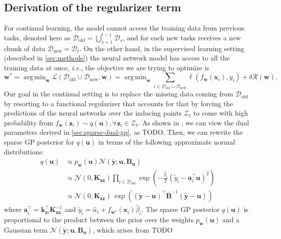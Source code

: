 \documentclass{article}
\makeatletter
\newcommand{\ie}{\textit{i.e.\@}\xspace}
\newcommand{\dataset}{\ensuremath{\mathcal{D}}}
\newcommand{\weights}{\ensuremath{\mathbf{w}}}
\newcommand{\mbf}[1]{\mathbf{#1}}
\newcommand{\MB}{\mbf{B}}
\newcommand{\vz}{\mbf{z}}
\newcommand{\vu}{\mbf{u}}
\newcommand{\vx}{\mbf{x}}
\newcommand{\vy}{\mbf{y}}
\newcommand{\vw}{\mbf{w}}
\newcommand{\va}{\mbf{a}}
\newcommand{\MKzz}{\mbf{K}_{\mbf{z}\mbf{z}}}
\newcommand{\vkzi}{\mbf{k}_{\mbf{z}i}}
\DeclareMathOperator*{\argmin}{arg\,min}
\newcommand{\Norm}{\mathcal{N}}
\makeatother
\begin{document}
\subsection{Derivation of the regularizer term}
For continual learning, the model cannot access the training data from previous tasks, denoted here as $\dataset_\textrm{old} = \bigcup_{s=1}^{t-1} \dataset_s$, and for each new tasks receives a new chunk of data $\dataset_\textrm{new} = \dataset_t$. On the other hand, in the supervised learning setting (described in \cref{sec:methods}) the neural network model has access to all the training data at once, \ie, the objective we are trying to optimize is
\begin{equation}
	\weights^* = \argmin_\weights \mathcal{L}(\dataset_\textrm{old} \cup \dataset_\textrm{new}, \weights) = \argmin_\weights \sum_{i \in \dataset_\textrm{old} \cup \dataset_\textrm{new}}\ell(f_\weights(\mathbf{x}_{i}), y_i) + \delta \mathcal{R}(\weights).
\end{equation} 
Our goal in the continual setting is to replace the missing data coming from $\dataset_\textrm{old}$ by resorting to a functional regularizer that accounts for that by forcing the predictions of the neural networks over the inducing points $\mathcal{Z}_t$ to come with high probability from $f_\weights(\vz_i) \sim q(\vu),  \forall \vz_i \in \mathcal{Z}_t$. As shown in \citep{khan2017conjugate, adam2021dual}, we can view the dual parameters derived in \cref{sec:sparse-dual-gp}, as {\color{red} TODO}.  Then, we can rewrite the sparse GP posterior for $q(\vu)$ in terms of the following approximate normal distributions:
%
\begin{align}
	q(\vu)
	& \propto p_\weights(\vu) \Norm(\tilde{\vy}; \vu, \MB_\vu)\\
	& \propto  \Norm(0, \MKzz) \prod_{i \in \dataset_\textrm{old}} \exp \! \left(-\frac{\hat{\beta}_i}{2}(\tilde{y}_i - \va_i^\top \vu)^2 \right) \\
	& \propto \Norm(0, \MKzz) \, \exp\left((\tilde{\vy} - \vu)^\top \bar{\MB}^{-1}(\tilde{\vy} - \vu)\right)
\end{align}
where $\va_i^\top = \vkzi^\top \MKzz^{-1}$ and $\tilde{y}_i = \hat{\alpha}_i + f_{\vw^*}(\vx_i)\hat{\beta}_i$.
The sparse GP posterior $q(\vu)$ is proportional to the product between the prior over the weights $p_\weights(\vu)$ and a Gaussian term $\Norm(\tilde{\vy}; \vu, \MB_\vu)$, which arises from {\color{red} TODO}
 
\end{document}
